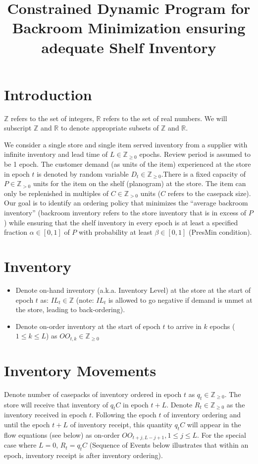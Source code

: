 \documentclass[12pt]{amsart}
\title{Constrained Dynamic Program for Backroom Minimization ensuring adequate Shelf Inventory}
\author{}
\date{} %
\begin{document}
\maketitle

\section{Introduction}

$\mathbb{Z}$ refers to the set of integers, $\mathbb{R}$ refers to the set of real numbers. We will subscript $\mathbb{Z}$ and $\mathbb{R}$ to denote appropriate subsets of $\mathbb{Z}$ and $\mathbb{R}$. 
 
We consider a single store and single item served inventory from a supplier with infinite inventory and lead time of $L \in \mathbb{Z}_{\geq 0}$ epochs. Review period is assumed to be 1 epoch. The  customer demand (as units of the item) experienced at the store in epoch $t$ is denoted by random variable $D_t \in \mathbb{Z}_{\geq 0}$.There is a fixed capacity of $P \in \mathbb{Z}_{> 0}$ units for the item on the shelf (planogram) at the store. The item can only be replenished in multiples of $C \in \mathbb{Z}_{> 0}$ units ($C$ refers to the casepack size). Our goal is to identify an ordering policy that minimizes the ``average backroom inventory'' (backroom inventory refers to the store inventory that is in excess of $P$) while ensuring that the shelf inventory in every epoch is at least a specified fraction $\alpha \in [0,1]$ of $P$ with probability at least $\beta \in [0,1]$ (PresMin condition).

\section{Inventory}
\begin{itemize}
\item Denote on-hand inventory (a.k.a. Inventory Level) at the store at the start of epoch $t$ as: $IL_t \in \mathbb{Z}$ (note: $IL_t$ is allowed to go negative if demand is unmet at the store, leading to back-ordering).
\item Denote on-order inventory at the start of epoch $t$ to arrive in $k$ epochs ($1 \leq k \leq L$)  as $OO_{t,k} \in \mathbb{Z}_{\geq 0}$
\end{itemize}

\section{Inventory Movements}
Denote number of casepacks of inventory ordered in epoch $t$ as $q_t \in \mathbb{Z}_{\geq 0}$. The store will receive that inventory of $q_t  C$ in epoch $t + L$. Denote $R_t \in \mathbb{Z}_{\geq 0}$ as the inventory received in epoch $t$. Following the epoch $t$ of inventory ordering and until the epoch $t+L$ of inventory receipt, this quantity $q_t C$ will appear in the flow equations (see below) as on-order $OO_{t+j,L-j+1}, 1 \leq j \leq L$. For the special case where $L = 0$, $R_t = q_t C$ (Sequence of Events below illustrates that within an epoch, inventory receipt is after inventory ordering).
\end{document}
